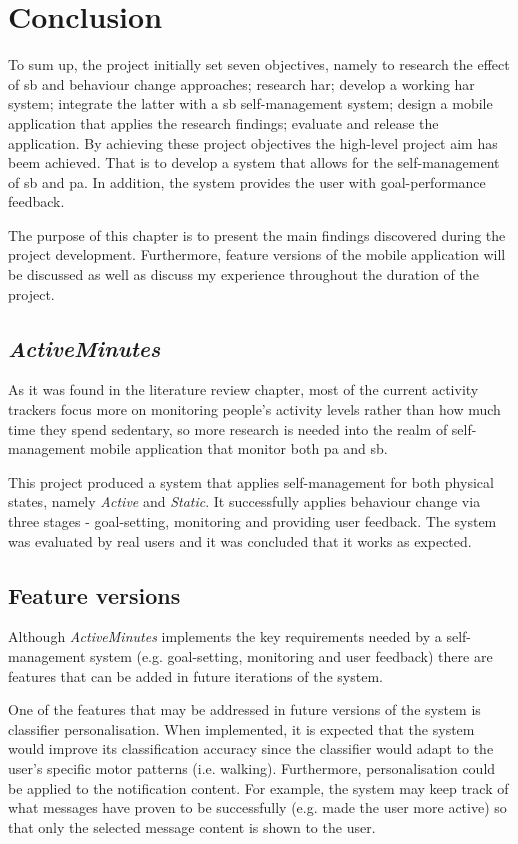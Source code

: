 \chapter{Conclusion}
To sum up, the project initially set seven objectives, namely to research the effect of \gls{sb} and behaviour change approaches; research \gls{har}; develop a working \gls{har} system; integrate the latter with a \gls{sb} self-management system; design a mobile application that applies the research findings; evaluate and release the application. By achieving these project objectives the high-level project aim has beem achieved. That is to develop a system that allows for the self-management of \gls{sb} and \gls{pa}. In addition, the system provides the user with goal-performance feedback. 

The purpose of this chapter is to present the main findings discovered during the project development. Furthermore, feature versions of the mobile application will be discussed as well as discuss my experience throughout the duration of the project. 

\section{\textit{ActiveMinutes}}
As it was found in the literature review chapter, most of the current activity trackers focus more on monitoring people's activity levels rather than how much time they spend sedentary, so more research is needed into the realm of self-management mobile application that monitor both \gls{pa} and \gls{sb}.

This project produced a system that applies self-management for both physical states, namely \textit{Active} and \textit{Static}. It successfully applies behaviour change via three stages - goal-setting, monitoring and providing user feedback. The system was evaluated by real users and it was concluded that it works as expected.

\section{Feature versions}
Although \textit{ActiveMinutes} implements the key requirements needed by a self-management system (e.g. goal-setting, monitoring and user feedback) there are features that can be added in future iterations of the system. 

One of the features that may be addressed in future versions of the system is classifier personalisation. When implemented, it is expected that the system would improve its classification accuracy since the classifier would adapt to the user's specific motor patterns (i.e. walking). Furthermore, personalisation could be applied to the notification content. For example, the system may keep track of what messages have proven to be successfully (e.g. made the user more active) so that only the selected message content is shown to the user.

